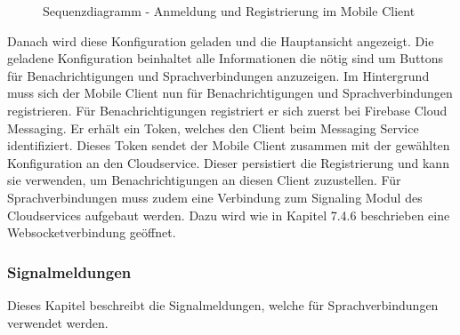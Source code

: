 \begin{figure}[h]
    \centering
    \begin{minipage}[b]{0.9\textwidth}
        \caption{Sequenzdiagramm - Anmeldung und Registrierung im Mobile Client}
    \end{minipage}
\end{figure}

Danach wird diese Konfiguration geladen und die Hauptansicht angezeigt.
Die geladene Konfiguration beinhaltet alle Informationen die nötig sind um Buttons für Benachrichtigungen und Sprachverbindungen anzuzeigen.
Im Hintergrund muss sich der Mobile Client nun für Benachrichtigungen und Sprachverbindungen registrieren.
Für Benachrichtigungen registriert er sich zuerst bei Firebase Cloud Messaging.
Er erhält ein Token, welches den Client beim Messaging Service identifiziert.
Dieses Token sendet der Mobile Client zusammen mit der gewählten Konfiguration an den Cloudservice.
Dieser persistiert die Registrierung und kann sie verwenden, um Benachrichtigungen an diesen Client zuzustellen.
Für Sprachverbindungen muss zudem eine Verbindung zum Signaling Modul des Cloudservices aufgebaut werden.
Dazu wird wie in Kapitel 7.4.6 beschrieben eine Websocketverbindung geöffnet.

\clearpage
\subsubsection{Signalmeldungen}

Dieses Kapitel beschreibt die Signalmeldungen, welche für Sprachverbindungen verwendet werden.

